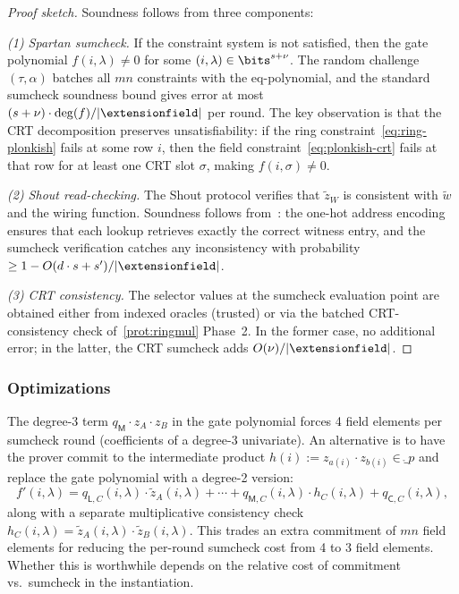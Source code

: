 \begin{proof}[Proof sketch]
Soundness follows from three components:

\emph{(1) Spartan sumcheck.}
If the constraint system is not satisfied, then the gate polynomial $f(i, \lambda) \neq 0$ for some $(i, \lambda) \in \bits^{s+\nu}$.
The random challenge $(\tau, \alpha)$ batches all $mn$ constraints with the eq-polynomial, and the standard sumcheck soundness bound gives error at most $(s + \nu) \cdot \deg(f) / |\extensionfield|$ per round.
The key observation is that the CRT decomposition preserves unsatisfiability: if the ring constraint~\eqref{eq:ring-plonkish} fails at some row $i$, then the field constraint~\eqref{eq:plonkish-crt} fails at that row for at least one CRT slot $\sigma$, making $f(i, \sigma) \neq 0$.

\emph{(2) Shout read-checking.}
The Shout protocol verifies that $\tilde{z}_W$ is consistent with $\tilde{w}$ and the wiring function.
Soundness follows from~\cite[Theorem 4.4]{twist-and-shout}: the one-hot address encoding ensures that each lookup retrieves exactly the correct witness entry, and the sumcheck verification catches any inconsistency with probability $\geq 1 - O(d \cdot s + s')/|\extensionfield|$.

\emph{(3) CRT consistency.}
The selector values at the sumcheck evaluation point are obtained either from indexed oracles (trusted) or via the batched CRT-consistency check of~\cref{prot:ringmul} Phase~2. In the former case, no additional error; in the latter, the CRT sumcheck adds $O(\nu)/|\extensionfield|$.
\end{proof}


\subsubsection{Optimizations}
\label{sec:ring-ss-optimizations}

The degree-3 term $q_\mathsf{M} \cdot z_A \cdot z_B$ in the gate polynomial forces 4 field elements per sumcheck round (coefficients of a degree-3 univariate).
An alternative is to have the prover commit to the intermediate product $h(i) := z_{a(i)} \cdot z_{b(i)} \in \ring_p$ and replace the gate polynomial with a degree-2 version:
\[
    f'(i, \lambda) = q_{\mathsf{L},C}(i,\lambda) \cdot \tilde{z}_A(i,\lambda) + \cdots + q_{\mathsf{M},C}(i,\lambda) \cdot h_C(i,\lambda) + q_{\mathsf{C},C}(i,\lambda),
\]
along with a separate multiplicative consistency check $h_C(i,\lambda) = \tilde{z}_A(i,\lambda) \cdot \tilde{z}_B(i,\lambda)$.
This trades an extra commitment of $mn$ field elements for reducing the per-round sumcheck cost from 4 to 3 field elements. Whether this is worthwhile depends on the relative cost of commitment vs.\ sumcheck in the instantiation.

